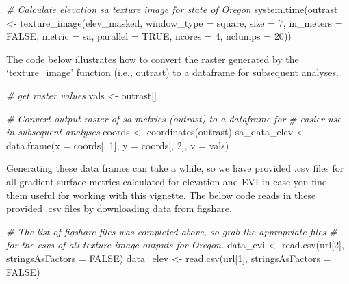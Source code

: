 \documentclass[
]{article}
\newenvironment{Shaded}{\begin{snugshade}}{\end{snugshade}}
\newcommand{\AttributeTok}[1]{\textcolor[rgb]{0.77,0.63,0.00}{#1}}
\newcommand{\CommentTok}[1]{\textcolor[rgb]{0.56,0.35,0.01}{\textit{#1}}}
\newcommand{\ConstantTok}[1]{\textcolor[rgb]{0.00,0.00,0.00}{#1}}
\newcommand{\DecValTok}[1]{\textcolor[rgb]{0.00,0.00,0.81}{#1}}
\newcommand{\FunctionTok}[1]{\textcolor[rgb]{0.00,0.00,0.00}{#1}}
\newcommand{\NormalTok}[1]{#1}
\newcommand{\OtherTok}[1]{\textcolor[rgb]{0.56,0.35,0.01}{#1}}
\newcommand{\StringTok}[1]{\textcolor[rgb]{0.31,0.60,0.02}{#1}}
\begin{document}
\begin{Shaded}
\begin{Highlighting}[]
\CommentTok{\# Calculate elevation sa texture image for state of Oregon}
\FunctionTok{system.time}\NormalTok{(outrast }\OtherTok{\textless{}{-}} \FunctionTok{texture\_image}\NormalTok{(elev\_masked, }\AttributeTok{window\_type =} \StringTok{\textquotesingle{}square\textquotesingle{}}\NormalTok{, }\AttributeTok{size =} \DecValTok{7}\NormalTok{, }
                         \AttributeTok{in\_meters =} \ConstantTok{FALSE}\NormalTok{, }\AttributeTok{metric =} \StringTok{\textquotesingle{}sa\textquotesingle{}}\NormalTok{, }\AttributeTok{parallel =} \ConstantTok{TRUE}\NormalTok{,}
                         \AttributeTok{ncores =} \DecValTok{4}\NormalTok{, }\AttributeTok{nclumps =} \DecValTok{20}\NormalTok{))}
\end{Highlighting}
\end{Shaded}

The code below illustrates how to convert the raster generated by the
`texture\_image' function (i.e., outrast) to a dataframe for subsequent
analyses.

\begin{Shaded}
\begin{Highlighting}[]
\CommentTok{\# get raster values}
\NormalTok{vals }\OtherTok{\textless{}{-}}\NormalTok{ outrast[]}

\CommentTok{\# Convert output raster of sa metrics (outrast) to a dataframe for }
\CommentTok{\# easier use in subsequent analyses}
\NormalTok{coords }\OtherTok{\textless{}{-}} \FunctionTok{coordinates}\NormalTok{(outrast)}
\NormalTok{sa\_data\_elev }\OtherTok{\textless{}{-}} \FunctionTok{data.frame}\NormalTok{(}\AttributeTok{x =}\NormalTok{ coords[, }\DecValTok{1}\NormalTok{], }\AttributeTok{y =}\NormalTok{ coords[, }\DecValTok{2}\NormalTok{], }\AttributeTok{v =}\NormalTok{ vals)}
\end{Highlighting}
\end{Shaded}

Generating these data frames can take a while, so we have provided .csv
files for all gradient surface metrics calculated for elevation and EVI
in case you find them useful for working with this vignette. The below
code reads in these provided .csv files by downloading data from
figshare.

\begin{Shaded}
\begin{Highlighting}[]
\CommentTok{\# The list of figshare files was completed above, so grab the appropriate files}
\CommentTok{\# for the csv\textquotesingle{}s of all texture image outputs for Oregon.}
\NormalTok{data\_evi }\OtherTok{\textless{}{-}} \FunctionTok{read.csv}\NormalTok{(url[}\DecValTok{2}\NormalTok{], }\AttributeTok{stringsAsFactors =} \ConstantTok{FALSE}\NormalTok{)}
\NormalTok{data\_elev }\OtherTok{\textless{}{-}} \FunctionTok{read.csv}\NormalTok{(url[}\DecValTok{1}\NormalTok{], }\AttributeTok{stringsAsFactors =} \ConstantTok{FALSE}\NormalTok{)}
\end{Highlighting}
\end{Shaded}
\end{document}
